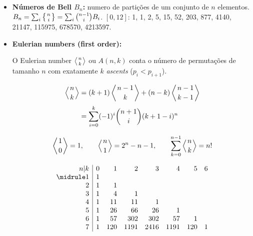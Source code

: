 \begin{small}
\begin{itemize}
\begin{itemize}
        \[\begin{array}{r||rrrrrrr}
        n|k & 0 & 1 & 2 & 3 & 4 & 5 & 6 \\\midrule
        0 & 1 &   &   &   &   &   &     \\
        1 &   & 1 &   &   &   &   &     \\
        2 &   & 1 & 1 &   &   &   &     \\
        3 &   & 1 & 3 & 1 &   &   &     \\
        4 &   & 1 & 7 & 6 & 1 &   &     \\
        5 &   & 1 & 15 & 25 & 10 & 1 &   \\
        6 &   & 1 & 31 & 90 & 65 & 15 & 1 \\
        \end{array}\]

    \end{itemize}

    \item \textbf{Números de Bell $B_n$:} numero de partições de um conjunto de $n$ elementos. $ B_n =  \sum_{i} \left\{{n \atop i}\right\}  = \sum_{i} \binom{n-1} {i} B_i $. 
$[0,12]$: 1, 1, 2, 5, 15, 52, 203, 877, 4140, 21147, 115975, 678570, 4213597.


\item \textbf{Eulerian numbers (first order):}

O Eulerian number $\left\langle{n\atop k}\right\rangle$ ou $A(n,k)$ conta o número de permutações de tamanho $n$ com exatamente $k$ \emph{ascents} ($p_i<p_{i+1}$).

\[
\begin{aligned}
\left\langle {n \atop k} \right\rangle
&=
(k+1)\left\langle {n-1 \atop k} \right\rangle
+
(n-k)\left\langle {n-1 \atop k-1} \right\rangle \\[2pt]
&=
\sum_{i=0}^{k}
(-1)^i \binom{n+1}{i}(k+1-i)^n
\end{aligned}
\]

\[
\left\langle{1\atop 0}\right\rangle = 1 
, \qquad 
\left\langle{n \atop 1}\right\rangle = 2^n - n - 1 
, \qquad 
\sum_{k=0}^{n-1} \left\langle{n\atop k}\right\rangle = n!
 \]


\[
\begin{array}{r|rrrrrrr}
n|k & 0 & 1 & 2 & 3 & 4 & 5 & 6\\\midrule
1 & 1 & & & & & & \\
2 & 1 & 1 & & & & & \\
3 & 1 & 4 & 1 & & & & \\
4 & 1 & 11 & 11 & 1 & & & \\
5 & 1 & 26 & 66 & 26 & 1 & & \\
6 & 1 & 57 & 302 & 302 & 57 & 1 & \\
7 & 1 & 120 & 1191 & 2416 & 1191 & 120 & 1\\
\end{array}
\]



\end{itemize}
\end{small}
